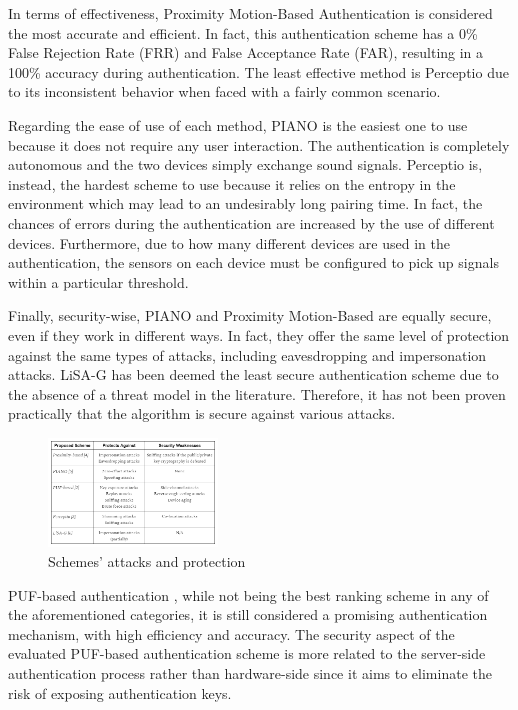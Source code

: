 \documentclass[10pt,twocolumn,letterpaper]{article}
\begin{document}
In terms of effectiveness, Proximity Motion-Based Authentication \cite{proxmotion} is considered the most accurate and efficient. In fact, this authentication scheme has a 0\% False Rejection Rate (FRR) and False Acceptance Rate (FAR), resulting in a 100\% accuracy during authentication. The least effective method is Perceptio \cite{perceptio} due to its inconsistent behavior when faced with a fairly common scenario.

Regarding the ease of use of each method, PIANO \cite{piano} is the easiest one to use because it does not require any user interaction. The authentication is completely autonomous and the two devices simply exchange sound signals. Perceptio is, instead, the hardest scheme to use because it relies on the entropy in the environment which may lead to an  undesirably long pairing time. In fact, the chances of errors during the authentication are increased by the use of different devices. Furthermore, due to how many different devices are used in the authentication, the sensors on each device must be configured to pick up signals within a particular threshold.

Finally, security-wise, PIANO and Proximity Motion-Based are equally secure, even if they work in different ways. In fact, they offer the same level of protection against the same types of attacks, including eavesdropping and impersonation attacks. LiSA-G \cite{lisag} has been deemed the least secure authentication scheme due to the absence of a threat model in the literature. Therefore, it has not been proven practically that the algorithm is secure against various attacks.

\begin{figure}[!ht]
  \centering
  \includegraphics[width=0.4\textwidth]{security.png}
  \caption{Schemes' attacks and protection}
\end{figure}

PUF-based authentication \cite{puf}, while not being the best ranking scheme in any of the aforementioned categories, it is still considered a promising authentication mechanism, with high efficiency and accuracy. The security aspect of the evaluated PUF-based authentication scheme is more related to the server-side authentication process rather than hardware-side since it aims to eliminate the risk of exposing authentication keys.
\end{document}
